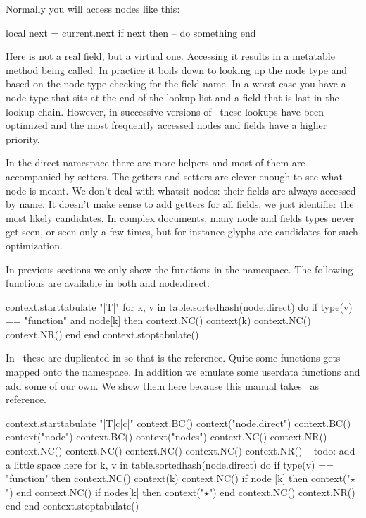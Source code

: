 Normally you will access nodes like this:

\starttyping
local next = current.next
if next then
    -- do something
end
\stoptyping

Here  is not a real field, but a virtual one. Accessing it results in
a metatable method being called. In practice it boils down to looking up the node
type and based on the node type checking for the field name. In a worst case you
have a node type that sits at the end of the lookup list and a field that is last
in the lookup chain. However, in successive versions of \LUATEX\ these lookups
have been optimized and the most frequently accessed nodes and fields have a
higher priority.

In the direct namespace there are more helpers and most of them are accompanied
by setters. The getters and setters are clever enough to see what node is meant.
We don't deal with whatsit nodes: their fields are always accessed by name. It
doesn't make sense to add getters for all fields, we just identifier the most
likely candidates. In complex documents, many node and fields types never get
seen, or seen only a few times, but for instance glyphs are candidates for such
optimization.

In previous sections we only show the functions in the 
namespace. The following functions are available in both  and \type
{node.direct}:

\startthreerows
\startluacode
    context.starttabulate { "|T|" }
    for k, v in table.sortedhash(node.direct) do
        if type(v) == "function" and node[k] then
            context.NC() context(k)
            context.NC() context.NR()
        end
    end
    context.stoptabulate()
\stopluacode
\stopthreerows

In \CONTEXT\ these are duplicated in  so that is the reference.
Quite some functions gets mapped onto the  namespace. In addition we
emulate some userdata functions and add some of our own. We show them here because
this manual takes \CONTEXT\ as reference.

\starttworows
\startluacode
    context.starttabulate { "|T|c|c|" }
        context.BC() context("node.direct")
        context.BC() context("node")
        context.BC() context("nodes")
        context.NC() context.NR()
        context.NC()
        context.NC()
        context.NC()
        context.NC() context.NR()
        -- todo: add a little space here
        for k, v in table.sortedhash(node.direct) do
            if type(v) == "function" then
                context.NC() context(k)
                context.NC() if node [k] then context("$⋆$") end
                context.NC() if nodes[k] then context("$⋆$") end
                context.NC() context.NR()
            end
        end
    context.stoptabulate()
\stopluacode
\stoptworows

